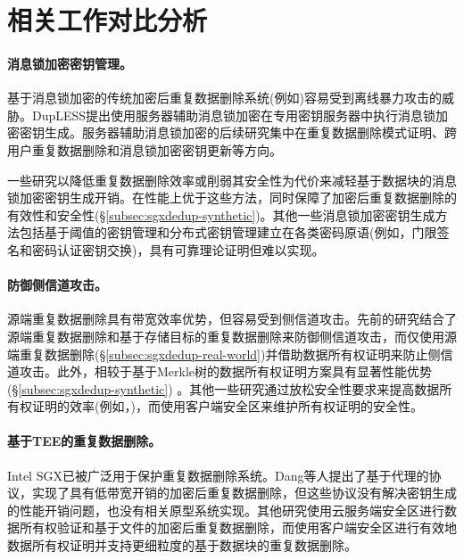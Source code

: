 \section{相关工作对比分析}
\label{sec:sgxdedup-related_work}

\paragraph*{消息锁加密密钥管理。} 基于消息锁加密的传统加密后重复数据删除系统(例如)容易受到离线暴力攻击的威胁。DupLESS提出使用服务器辅助消息锁加密在专用密钥服务器中执行消息锁加密密钥生成。服务器辅助消息锁加密的后续研究集中在重复数据删除模式证明、跨用户重复数据删除和消息锁加密密钥更新等方向。

一些研究以降低重复数据删除效率或削弱其安全性为代价来减轻基于数据块的消息锁加密密钥生成开销。\sysnameS 在性能上优于这些方法，同时保障了加密后重复数据删除的有效性和安全性(\S\ref{subsec:sgxdedup-synthetic})。其他一些消息锁加密密钥生成方法包括基于阈值的密钥管理和分布式密钥管理建立在各类密码原语(例如，门限签名和密码认证密钥交换)，具有可靠理论证明但难以实现。

\paragraph*{防御侧信道攻击。}源端重复数据删除具有带宽效率优势，但容易受到侧信道攻击。先前的研究结合了源端重复数据删除和基于存储目标的重复数据删除来防御侧信道攻击，而\sysnameS 仅使用源端重复数据删除(\S\ref{subsec:sgxdedup-real-world})并借助数据所有权证明来防止侧信道攻击。此外，\sysnameS 相较于基于Merkle树的数据所有权证明方案具有显著性能优势(\S\ref{subsec:sgxdedup-synthetic}) 。其他一些研究通过放松安全性要求来提高数据所有权证明的效率(例如，)，而\sysnameS 使用客户端安全区来维护所有权证明的安全性。

\paragraph*{基于TEE的重复数据删除。} Intel SGX已被广泛用于保护重复数据删除系统。Dang等人提出了基于代理的协议，实现了具有低带宽开销的加密后重复数据删除，但这些协议没有解决密钥生成的性能开销问题，也没有相关原型系统实现。其他研究使用云服务端安全区进行数据所有权验证和基于文件的加密后重复数据删除，而\sysnameS 使用客户端安全区进行有效地数据所有权证明并支持更细粒度的基于数据块的重复数据删除。
